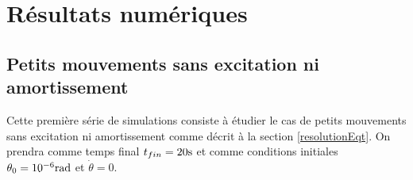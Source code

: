 \documentclass[a4paper,12pt,oneside]{article}
\def \t {\theta}
\def \vt {\Dot{\theta}}
\begin{document}
\newpage \section{Résultats numériques}


\subsection{Petits mouvements sans excitation ni amortissement}
Cette première série de simulations consiste à étudier le cas de petits mouvements sans excitation ni amortissement comme décrit à la section \ref{resolutionEqt}. On prendra comme temps final $t_{fin}=20 \rm s$ et comme conditions initiales $\t_0=10^{-6} \rm{rad}$ et $\vt=0$.
\end{document}
